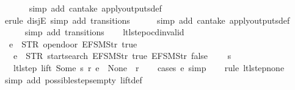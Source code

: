 \begin{isabellebody}
\ \ \ \ \ \isamarkupfalse%
\ {\isacharparenleft}simp\ add{\isacharcolon}\ can{\isacharunderscore}take\ apply{\isacharunderscore}outputs{\isacharunderscore}def{\isacharparenright}\isanewline
\ \ \ \ \isamarkupfalse%
\ {\isacharparenleft}erule\ disjE{\isacharcomma}\ simp\ add{\isacharcolon}\ transitions{\isacharparenright}{\isacharplus}\isanewline
\ \ \ \ \isamarkupfalse%
\ {\isacharparenleft}simp\ add{\isacharcolon}\ can{\isacharunderscore}take\ apply{\isacharunderscore}outputs{\isacharunderscore}def{\isacharparenright}\isanewline
\ \ \ \ \isamarkupfalse%
\ {\isacharparenleft}simp\ add{\isacharcolon}\ transitions{\isacharparenright}\isanewline
\ \ \isamarkupfalse%
%
\endisatagproof
{\isafoldproof}%
%
\isadelimproof
\isanewline
%
\endisadelimproof
\isanewline
{}\isamarkupfalse%
\ ltl{\isacharunderscore}step{\isacharunderscore}ocd{\isacharunderscore}invalid{\isacharcolon}\isanewline
\ \ {\isachardoublequoteopen}e\ {\isasymnoteq}\ {\isacharparenleft}STR\ {\isacharprime}{\isacharprime}opendoor{\isacharprime}{\isacharprime}{\isacharcomma}\ {\isacharbrackleft}EFSM{\isachardot}Str\ {\isacharprime}{\isacharprime}true{\isacharprime}{\isacharprime}{\isacharbrackright}{\isacharparenright}\ {\isasymLongrightarrow}\isanewline
\ \ \ e\ {\isasymnoteq}\ {\isacharparenleft}STR\ {\isacharprime}{\isacharprime}startsearch{\isacharprime}{\isacharprime}{\isacharcomma}\ {\isacharbrackleft}EFSM{\isachardot}Str\ {\isacharprime}{\isacharprime}true{\isacharprime}{\isacharprime}{\isacharcomma}\ EFSM{\isachardot}Str\ {\isacharprime}{\isacharprime}false{\isacharprime}{\isacharprime}{\isacharbrackright}{\isacharparenright}\ {\isasymLongrightarrow}\isanewline
\ \ \ s\ {\isasymin}\ {\isacharbraceleft}{}{\isacharcomma}\ {}{\isacharcomma}\ {}{\isacharcomma}\ {}{\isacharbraceright}\ {\isasymLongrightarrow}\isanewline
\ \ \ ltl{\isacharunderscore}step\ lift\ {\isacharparenleft}Some\ s{\isacharparenright}\ r\ e\ {\isacharequal}\ {\isacharparenleft}None{\isacharcomma}\ {\isacharbrackleft}{\isacharbrackright}{\isacharcomma}\ r{\isacharparenright}{\isachardoublequoteclose}\isanewline
%
\isadelimproof
\ \ %
\endisadelimproof
%
\isatagproof
{}\isamarkupfalse%
\ {\isacharparenleft}cases\ e{\isacharcomma}\ simp{\isacharparenright}\isanewline
\ \ \isamarkupfalse%
\ {\isacharparenleft}rule\ ltl{\isacharunderscore}step{\isacharunderscore}none{\isacharparenright}\isanewline
\ \ \isamarkupfalse%
\ {\isacharparenleft}simp\ add{\isacharcolon}\ possible{\isacharunderscore}steps{\isacharunderscore}empty\ lift{\isacharunderscore}def{\isacharparenright}\isanewline

\end{isabellebody}
